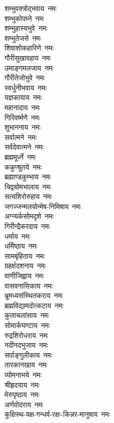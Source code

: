 \begin{multicols}{2}
\begin{flushleft}
शम्भुवक्त्रोद्भवाय~नमः\hfill{}\\
शम्भुकोपघ्ने~नमः\\
शम्भुहास्यभुवे~नमः\\
शम्भुतेजसे~नमः\\
शिवाशोकहारिणे~नमः\\
गौरीसुखावहाय~नमः\\
उमाङ्गमलजाय~नमः\\
गौरीतेजोभुवे~नमः\\
स्वर्धुनीभवाय~नमः\\
यज्ञकायाय~नमः\\
महानादाय~नमः\hfill{}\\
गिरिवर्ष्मणे~नमः\\
शुभाननाय~नमः\\
सर्वात्मने~नमः\\
सर्वदेवात्मने~नमः\\
ब्रह्ममूर्ध्ने~नमः\\
ककुप्श्रुतये~नमः\\
ब्रह्माण्डकुम्भाय~नमः\\
चिद्व्योमभालाय~नमः\\
सत्यशिरोरुहाय~नमः\\
जगज्जन्मलयोन्मेष-निमिषाय~नमः\hfill{}\\
अग्न्यर्कसोमदृशे~नमः\\
गिरीन्द्रैकरदाय~नमः\\
धर्माय~नमः\\
धर्मिष्ठाय~नमः\\
सामबृंहिताय~नमः\\
ग्रहर्क्षदशनाय~नमः\\
वाणीजिह्वाय~नमः\\
वासवनासिकाय~नमः\\
भ्रूमध्यसंस्थितकराय~नमः\\
ब्रह्मविद्यामदोत्कटाय~नमः\hfill{}\\
कुलाचलांसाय~नमः\\
सोमार्कघण्टाय~नमः\\
रुद्रशिरोधराय~नमः\\
नदीनदभुजाय~नमः\\
सर्पाङ्गुलीकाय~नमः\\
तारकानखाय~नमः\\
व्योमनाभये~नमः\\
श्रीहृदयाय~नमः\\
मेरुपृष्ठाय~नमः\\
अर्णवोदराय~नमः\hfill{}\\
कुक्षिस्थ-यक्ष-गन्धर्व-रक्षः-किन्नर-मानुषाय~नमः\\

\end{flushleft}
\end{multicols}
